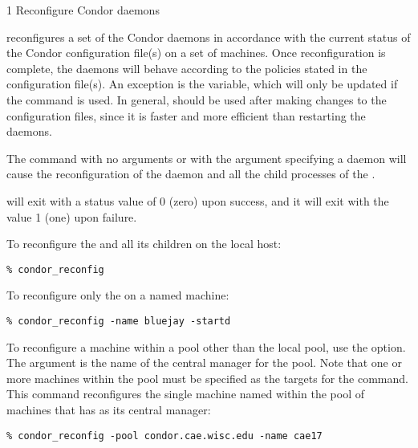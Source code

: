 \begin{ManPage}{\label{man-condor-reconfig}}{1}
{Reconfigure Condor daemons}
\Synopsis {}
\ToolArgsBase

\ToolArgsLocate
\ToolArgsAffect

\ToolWhere
\ToolArgsAffect


\Description 

 reconfigures a set of the Condor daemons in
accordance with the current
status of the Condor configuration file(s) on a set of machines.
Once reconfiguration is complete,
the daemons will behave according to the policies
stated in the configuration file(s).
An exception is the  variable, which will only be
updated if the  command is used.
In general,  should be used after making
changes to the configuration files,
since it is faster and more efficient than restarting the daemons.

The command 
with no arguments or with the  argument specifying
a daemon will cause the reconfiguration of the 
daemon and all the child processes of the .

\begin{Options}
	\ToolArgsDesc
\end{Options}

\ExitStatus

 will exit with a status value of 0 (zero) upon success,
and it will exit with the value 1 (one) upon failure.

\Examples
To reconfigure the  and all its children
on the local host:
\begin{verbatim}
% condor_reconfig
\end{verbatim}

To reconfigure only the  on a named machine:
\begin{verbatim}
% condor_reconfig -name bluejay -startd
\end{verbatim}

To reconfigure a machine within a pool
other than the local pool, use the  option.
The argument is the name of the central manager for the pool.
Note that one or more machines within the pool must be
specified as the targets for the command.
This command reconfigures
the single machine named  within the
pool of machines that has  as
its central manager:
\begin{verbatim}
% condor_reconfig -pool condor.cae.wisc.edu -name cae17
\end{verbatim}

\end{ManPage}
